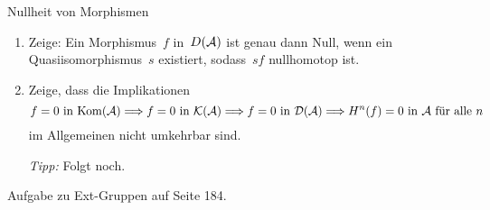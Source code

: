 \documentclass{uebblatt}
\begin{document}
\begin{aufgabe}{Nullheit von Morphismen}
\begin{enumerate}
\item Zeige: Ein Morphismus~$f$ in~$D(\mathcal{A})$ ist genau dann Null, wenn ein
Quasiisomorphismus~$s$ existiert, sodass~$sf$ nullhomotop ist.
\item Zeige, dass die Implikationen
\[ \text{$f = 0$ in $\mathrm{Kom}(\mathcal{A})$} \Longrightarrow
   \text{$f = 0$ in $\mathcal{K}(\mathcal{A})$} \Longrightarrow
   \text{$f = 0$ in $\mathcal{D}(\mathcal{A})$} \Longrightarrow
   \text{$H^n(f) = 0$ in $\mathcal{A}$ für alle~$n$}
\]
im Allgemeinen nicht umkehrbar sind.

\emph{Tipp:} Folgt noch.
\end{enumerate}
\end{aufgabe}

Aufgabe zu Ext-Gruppen auf Seite 184.
\end{document}
